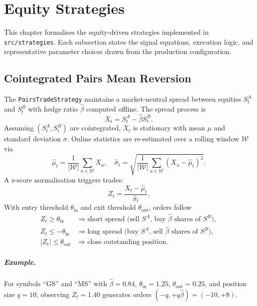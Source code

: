 \chapter{Equity Strategies}

This chapter formalises the equity-driven strategies implemented in \texttt{src/strategies}. Each subsection states the signal equations, execution logic, and representative parameter choices drawn from the production configuration.

\section{Cointegrated Pairs Mean Reversion}
The \texttt{PairsTradeStrategy} maintains a market-neutral spread between equities $S^A_t$ and $S^B_t$ with hedge ratio $\hat{\beta}$ computed offline. The spread process is
\begin{equation}
X_t = S^A_t - \hat{\beta} S^B_t.
\end{equation}
Assuming $(S^A_t, S^B_t)$ are cointegrated, $X_t$ is stationary with mean $\mu$ and standard deviation $\sigma$. Online statistics are re-estimated over a rolling window $\mathcal{W}$ via
\begin{equation}
\hat{\mu}_t = \frac{1}{|\mathcal{W}|} \sum_{u \in \mathcal{W}} X_u, \quad
\hat{\sigma}_t = \sqrt{\frac{1}{|\mathcal{W}|} \sum_{u \in \mathcal{W}} (X_u - \hat{\mu}_t)^2}.
\end{equation}
A z-score normalisation triggers trades:
\begin{equation}
Z_t = \frac{X_t - \hat{\mu}_t}{\hat{\sigma}_t}.
\end{equation}
With entry threshold $\theta_{\text{in}}$ and exit threshold $\theta_{\text{out}}$, orders follow
\begin{align*}
Z_t \geq \theta_{\text{in}} &\Rightarrow \text{short spread (sell $S^A$, buy $\hat{\beta}$ shares of $S^B$)},\\
Z_t \leq -\theta_{\text{in}} &\Rightarrow \text{long spread (buy $S^A$, sell $\hat{\beta}$ shares of $S^B$)},\\
|Z_t| \leq \theta_{\text{out}} &\Rightarrow \text{close outstanding position}.
\end{align*}

\paragraph{Example.} For symbols ``GS'' and ``MS'' with $\hat{\beta}=0.84$, $\theta_{\text{in}}=1.25$, $\theta_{\text{out}}=0.25$, and position size $q=10$, observing $Z_t=1.40$ generates orders $(-q, +q\hat{\beta}) = (-10, +8)$.

